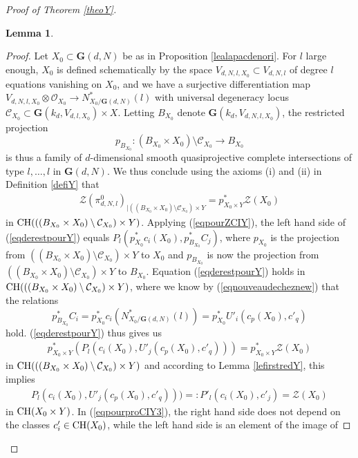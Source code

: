 \documentclass[10pt]{article}
\newtheorem{lemm}[theo]{Lemma}
\begin{document}
\begin{proof}[Proof of Theorem \ref{theoY}]
\begin{lemm}
\end{lemm}
\begin{proof} Let $X_0\subset \mathbf{G}(d,N)$ be as in Proposition \ref{lealapacdenori}. For $l$ large enough, $X_0$ is defined schematically by the space
$V_{d,N,l,X_0}\subset V_{d,N,l}$ of degree $l$ equations vanishing on $X_0$, and we have
a surjective differentiation map $V_{d,N,l,X_0}\otimes \mathcal{O}_{X_0}\rightarrow N_{X_0/\mathbf{G}(d,N)}^*(l)$ with universal degeneracy locus
$\mathcal{C}_{X_0}\subset \mathbf{G}(k_d,V_{d,l,X_0})\times X$. Letting $B_{X_0}$ denote $\mathbf{G}(k_d,V_{d,N,l,X_0})$, the restricted projection
$$p_{B_{X_0}}:(B_{X_0}\times X_0)\setminus \mathcal{C}_{X_0}\rightarrow  B_{X_0}$$
 is thus a family
of $d$-dimensional smooth quasiprojective complete intersections of type $l,\ldots,l$ in $\mathbf{G}(d,N)$. We thus
  conclude using the axioms (i) and (ii) in Definition \ref{defiY}  that
\begin{eqnarray}\label{eqderestpourY} \mathcal{Z}(\pi_{d,N,l}^0)_{\mid ((B_{X_0}\times X_0)\setminus \mathcal{C}_{X_0})\times Y}=p_{X_0\times Y}^*\mathcal{Z}(X_0)
\end{eqnarray}
in ${\rm CH}(((B_{X_0}\times X_0)\setminus \mathcal{C}_{X_0})\times Y)$.
Applying (\ref{eqpourZCIY}), the left hand side of (\ref{eqderestpourY}) equals
$P_l(p_{X_0}^*c_i(X_0),p_{B_{X_0}}^*C_j)$, where
$p_{X_0}$ is the projection from $((B_{X_0}\times X_0)\setminus \mathcal{C}_{X_0})\times Y$ to $X_0$ and $p_{B_{X_0}}$ is now the projection from $((B_{X_0}\times X_0)\setminus \mathcal{C}_{X_0})\times Y$ to $B_{X_0}$.
Equation (\ref{eqderestpourY}) holds in  ${\rm CH}(((B_{X_0}\times X_0)\setminus \mathcal{C}_{X_0})\times Y)$, where we know by (\ref{eqnouveaudecheznew}) that
the  relations $$p_{B_{X_0}}^*C_i=p_{X_0}^*c_i(N_{X_0/\mathbf{G}(d,N)}^*(l))=p_{X_0}^*U'_i(c_p(X_0),c'_q)$$ hold. (\ref{eqderestpourY}) thus gives us
\begin{eqnarray}\label{eqpourproCIY2} p_{X_0\times Y}^*(P_l(c_i(X_0),U'_j(c_p(X_0),c'_q)))=p_{X_0\times Y}^*\mathcal{Z}(X_0)
\end{eqnarray}
in ${\rm CH}(((B_{X_0}\times X_0)\setminus \mathcal{C}_{X_0})\times Y)$ and according to Lemma \ref{lefirstredY}, this implies
\begin{eqnarray}\label{eqpourproCIY3} P_l(c_i(X_0),U'_j(c_p(X_0),c'_q)))=:P'_l(c_i(X_0),c'_j)=\mathcal{Z}(X_0)
\end{eqnarray}
in ${\rm CH}(X_0\times Y)$.
In (\ref{eqpourproCIY3}), the right hand side does not depend on the classes  $c'_i\in {\rm CH}(X_0)$, while the left hand side is an element of  the image of

\end{proof}
\end{proof}
\end{document}
